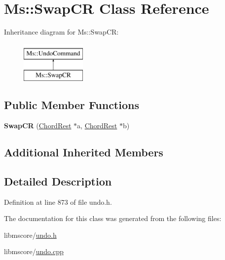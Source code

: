\hypertarget{class_ms_1_1_swap_c_r}{}\section{Ms\+:\+:Swap\+CR Class Reference}
\label{class_ms_1_1_swap_c_r}
Inheritance diagram for Ms\+:\+:Swap\+CR\+:\begin{figure}[H]
\begin{center}
\leavevmode
\includegraphics[height=2.000000cm]{class_ms_1_1_swap_c_r}
\end{center}
\end{figure}
\subsection*{Public Member Functions}
\begin{DoxyCompactItemize}
\item 
\mbox{\label{class_ms_1_1_swap_c_r_ad7b27badc8644d6c05b295657648e314}} 
{\bfseries Swap\+CR} (\hyperlink{class_ms_1_1_chord_rest}{Chord\+Rest} $\ast$a, \hyperlink{class_ms_1_1_chord_rest}{Chord\+Rest} $\ast$b)
\end{DoxyCompactItemize}
\subsection*{Additional Inherited Members}


\subsection{Detailed Description}


Definition at line 873 of file undo.\+h.



The documentation for this class was generated from the following files\+:\begin{DoxyCompactItemize}
\item 
libmscore/\hyperlink{undo_8h}{undo.\+h}\item 
libmscore/\hyperlink{undo_8cpp}{undo.\+cpp}\end{DoxyCompactItemize}
